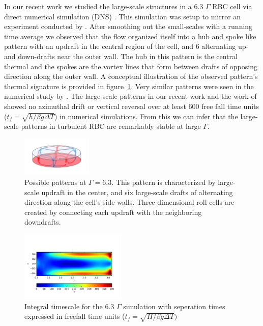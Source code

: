 \documentclass[twocolumn,10pt]{tsfp}
\begin{document}
In our recent work we studied the large-scale structures in a 6.3 $\Gamma$ RBC cell via direct numerical simulation (DNS) \citep{sakievich2016large}.  This simulation was setup to mirror an experiment conducted by \cite{fernandes2001spatial}. After smoothing out the small-scales with a running time average we observed that the flow organized itself into a hub and spoke like pattern with an updraft in the central region of the cell, and 6 alternating up- and down-drafts near the outer wall.  The hub in this pattern is the central thermal and the spokes are the vortex lines that form between drafts of opposing direction along the outer wall.  A conceptual illustration of the observed pattern's thermal signature is provided in figure~\ref{fig:63ar}. Very similar patterns were seen in the numerical study by \cite{bailon2010aspect}. The large-scale patterns in our recent work \cite{sakievich2016large} and the work of \cite{bailon2010aspect} showed no azimuthal drift or vertical reversal over at least 600 free fall time units ($t_f=\sqrt{h/\beta g \Delta T}$) in numerical simulations. From this we can infer that the large-scale patterns in turbulent RBC are remarkably stable at large $\Gamma$.

\begin{figure}
\centering
\includegraphics[page=1,trim=4.1cm 3cm 4.1cm 3cm, clip, width=0.3\textwidth]{Ar63Sym}

\caption{Possible patterns at $\Gamma=6.3$.  This pattern is characterized by large-scale updraft in the center, and six large-scale drafts of alternating direction along the cell's side walls. Three dimensional roll-cells are created by connecting each updraft with the neighboring downdrafts. }
\label{fig:63ar}
\end{figure}

\begin{figure}
\begin{center}
\includegraphics[trim=0cm 1.0cm 0.7cm 2.7cm,clip,width=0.45\textwidth]{IntegralTS_TE}
\caption{Integral timescale for the 6.3 $\Gamma$ simulation with seperation times expressed in freefall time units ($t_f=\sqrt{H/\beta g \Delta T})$}
\label{default}
\end{center}
\end{figure}
\end{document}

